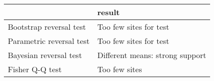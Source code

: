 \begin{tabular}{ll}
\toprule
{} &                           result \\
\midrule
Bootstrap reversal test  &           Too few sites for test \\
Parametric reversal test &           Too few sites for test \\
Bayesian reversal test   &  Different means: strong support \\
Fisher Q-Q test          &                    Too few sites \\
\bottomrule
\end{tabular}
